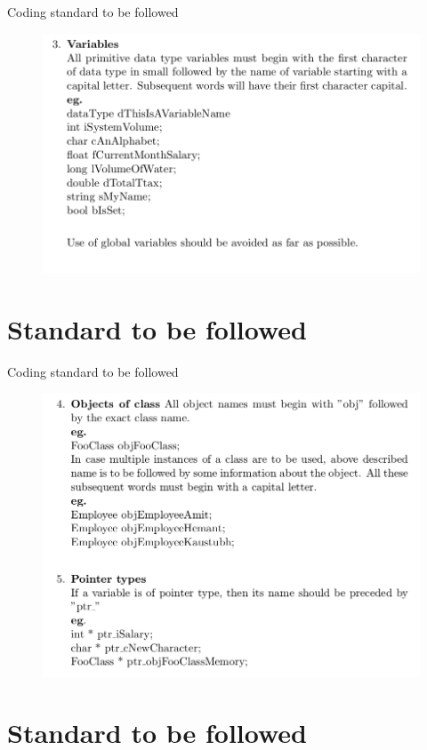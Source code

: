 \documentclass[color=usenames,dvipsnames]{beamer}
\begin{document}
\begin{frame}{Coding standard to be followed}

\begin{figure}[h!]  
  \centering
  \includegraphics[width=.9\textwidth]{2.png}  
  \end{figure} 
\end{frame}

\section{Standard to be followed}

\begin{frame}{Coding standard to be followed}

\begin{figure}[h!]  
  \centering
  \includegraphics[width=.85\textwidth]{3.png}  
  \end{figure} 
\end{frame}

\section{Standard to be followed}
\end{document}
